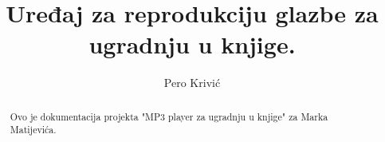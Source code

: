 \documentclass[]{report}
\title{Uređaj za reprodukciju glazbe za ugradnju u knjige.}
\author{Pero Krivi\'c}
\begin{document}
\maketitle

\begin{abstract}
	
	Ovo je dokumentacija projekta "MP3 player za ugradnju u knjige" za Marka Matijevića.
	
\end{abstract}

%
\end{document}
